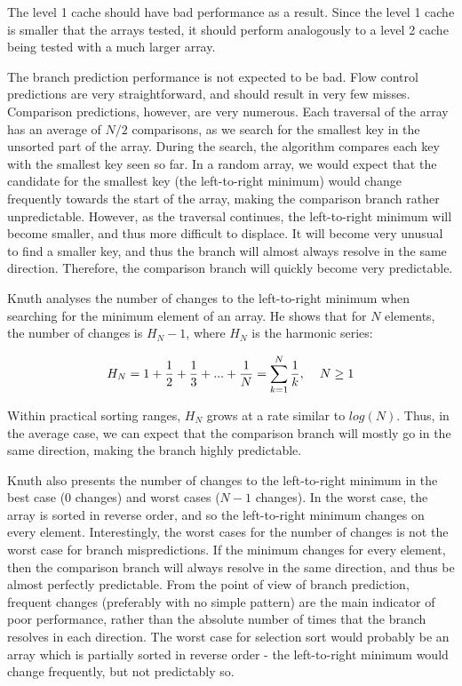 The level 1 cache should have bad performance as a result. Since the level 1
cache is smaller that the arrays tested, it should perform analogously to a
level 2 cache being tested with a much larger array.

\label{selection branches harmonics}
The branch prediction performance is not expected to be bad. Flow control
predictions are very straightforward, and should result in very few misses.
Comparison predictions, however, are very numerous. Each traversal of the array
has an average of $N/2$ comparisons, as we search for the smallest key in the
unsorted part of the array. During the search, the algorithm compares each key
with the smallest key seen so far. In a random array, we would expect that the
candidate for the smallest key (the left-to-right minimum) would change
frequently towards the start of the array, making the comparison branch rather
unpredictable. However, as the traversal continues, the left-to-right minimum
will become smaller, and thus more difficult to displace. It will become very
unusual to find a smaller key, and thus the branch will almost always resolve in
the same direction. Therefore, the comparison branch will quickly become very
predictable.

Knuth \cite{Knuth97} analyses the number of changes to the left-to-right minimum
when searching for the minimum element of an array. He shows that for $N$
elements, the number of changes is $H_N - 1$, where $H_N$ is the harmonic
series:

$$H_N = 1 + \frac{1}{2} + \frac{1}{3} + ... + \frac{1}{N} =  \sum_{k=1}^{N}
\frac{1}{k},  \hspace{0.4cm}  N \geq 1$$

Within practical sorting ranges, $H_N$ grows at a rate similar to
$log(N)$. Thus, in the average case, we can expect that the comparison branch
will mostly go in the same direction, making the branch highly predictable.

Knuth also presents the number of changes to the left-to-right minimum in the
best case (0 changes) and worst cases ($N-1$ changes). In the worst case, the
array is sorted in reverse order, and so the left-to-right minimum changes on
every element. Interestingly, the worst cases for the number of changes is not
the worst case for branch mispredictions. If the minimum changes for every
element, then the comparison branch will always resolve in the same direction,
and thus be almost perfectly predictable. From the point of view of branch
prediction, frequent changes (preferably with no simple pattern) are the main
indicator of poor performance, rather than the absolute number of times that the
branch resolves in each direction. The worst case for selection sort would
probably be an array which is partially sorted in reverse order - the
left-to-right minimum would change frequently, but not predictably so.

